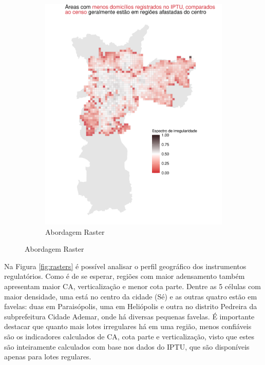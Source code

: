 \begin{figure}[h]
\begin{subfigure}[t]{0.45\linewidth}
        \includegraphics[width = \linewidth]{imagens/balanco_raster.pdf}
        \caption{Abordagem Raster}
        \label{fig:balanco-raster}
    \end{subfigure}
    \label{fig:erros-join}
\end{figure}

Na Figura \ref{fig:rasters} é possível analisar o perfil geográfico dos instrumentos regulatórios. Como é de se esperar, regiões com maior adensamento também apresentam maior CA, verticalização e menor cota parte. Dentre as 5 células com maior densidade, uma está no centro da cidade (Sé) e as outras quatro estão em favelas: duas em Paraisópolis, uma em Heliópolis e outra no distrito Pedreira da subprefeitura Cidade Ademar, onde há diversas pequenas favelas. É importante destacar que quanto mais lotes irregulares há em uma região, menos confiáveis são os indicadores calculados de CA, cota parte e verticalização, visto que estes são inteiramente calculados com base nos dados do IPTU, que são disponíveis apenas para lotes regulares.

